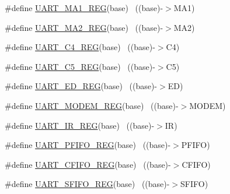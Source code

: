 \begin{DoxyCompactItemize}
\item 
\#define \hyperlink{group___u_a_r_t___register___accessor___macros_ga429d595b0b07bc30a6d62832eec7ba1b}{U\+A\+R\+T\+\_\+\+M\+A1\+\_\+\+R\+EG}(base)                                          ~((base)-\/$>$M\+A1)
\item 
\#define \hyperlink{group___u_a_r_t___register___accessor___macros_gac6084c1fb51427542a68f94fdfde5249}{U\+A\+R\+T\+\_\+\+M\+A2\+\_\+\+R\+EG}(base)                                          ~((base)-\/$>$M\+A2)
\item 
\#define \hyperlink{group___u_a_r_t___register___accessor___macros_ga53f71f873e006d84f394f97bb65e5174}{U\+A\+R\+T\+\_\+\+C4\+\_\+\+R\+EG}(base)                                            ~((base)-\/$>$C4)
\item 
\#define \hyperlink{group___u_a_r_t___register___accessor___macros_gac990a0ea0a078cb39530836bf18de75c}{U\+A\+R\+T\+\_\+\+C5\+\_\+\+R\+EG}(base)                                            ~((base)-\/$>$C5)
\item 
\#define \hyperlink{group___u_a_r_t___register___accessor___macros_ga57f93e1822a33516f473d1b62075115a}{U\+A\+R\+T\+\_\+\+E\+D\+\_\+\+R\+EG}(base)                                            ~((base)-\/$>$ED)
\item 
\#define \hyperlink{group___u_a_r_t___register___accessor___macros_ga7508e2348a7d075db40ace1902a407fa}{U\+A\+R\+T\+\_\+\+M\+O\+D\+E\+M\+\_\+\+R\+EG}(base)                                      ~((base)-\/$>$M\+O\+D\+EM)
\item 
\#define \hyperlink{group___u_a_r_t___register___accessor___macros_gae4a662d77f88c67afe8fe2c1d5e2fa81}{U\+A\+R\+T\+\_\+\+I\+R\+\_\+\+R\+EG}(base)                                            ~((base)-\/$>$IR)
\item 
\#define \hyperlink{group___u_a_r_t___register___accessor___macros_ga7cb53756bda6ba3cb137ecf5ac5f13ae}{U\+A\+R\+T\+\_\+\+P\+F\+I\+F\+O\+\_\+\+R\+EG}(base)                                      ~((base)-\/$>$P\+F\+I\+FO)
\item 
\#define \hyperlink{group___u_a_r_t___register___accessor___macros_gaabc1c7c6bba8bb960193478fa697fe15}{U\+A\+R\+T\+\_\+\+C\+F\+I\+F\+O\+\_\+\+R\+EG}(base)                                      ~((base)-\/$>$C\+F\+I\+FO)
\item 
\#define \hyperlink{group___u_a_r_t___register___accessor___macros_ga6cb39496b0199428a152fa8a68ec6a56}{U\+A\+R\+T\+\_\+\+S\+F\+I\+F\+O\+\_\+\+R\+EG}(base)                                      ~((base)-\/$>$S\+F\+I\+FO)
\item 

\end{DoxyCompactItemize}
